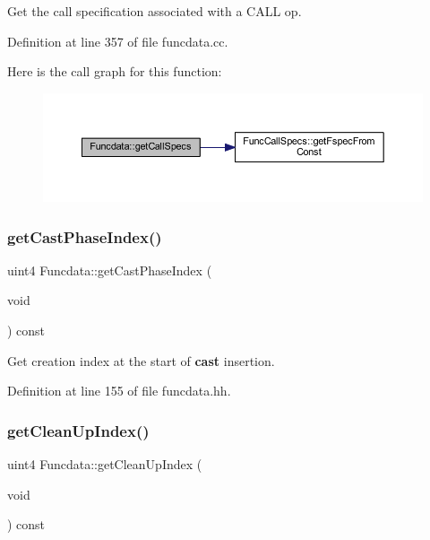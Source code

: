 Get the call specification associated with a C\+A\+LL op. 



Definition at line 357 of file funcdata.\+cc.

Here is the call graph for this function\+:
\nopagebreak
\begin{figure}[H]
\begin{center}
\leavevmode
\includegraphics[width=350pt]{class_funcdata_a952f07a6db222c00cc243917767dcdc1_cgraph}
\end{center}
\end{figure}
\mbox{\label{class_funcdata_a4a6eb70553bc51e0ed7d2acde1b080ad}} 
\subsubsection{\texorpdfstring{getCastPhaseIndex()}{getCastPhaseIndex()}}
{\footnotesize\ttfamily uint4 Funcdata\+::get\+Cast\+Phase\+Index (\begin{DoxyParamCaption}\item[{void}]{ }\end{DoxyParamCaption}) const\hspace{0.3cm}{\ttfamily [inline]}}



Get creation index at the start of {\bfseries{cast}} insertion. 



Definition at line 155 of file funcdata.\+hh.

\mbox{\label{class_funcdata_a960bb129d667590b2f3eb73b99984954}} 
\subsubsection{\texorpdfstring{getCleanUpIndex()}{getCleanUpIndex()}}
{\footnotesize\ttfamily uint4 Funcdata\+::get\+Clean\+Up\+Index (\begin{DoxyParamCaption}\item[{void}]{ }\end{DoxyParamCaption}) const\hspace{0.3cm}{\ttfamily [inline]}}



